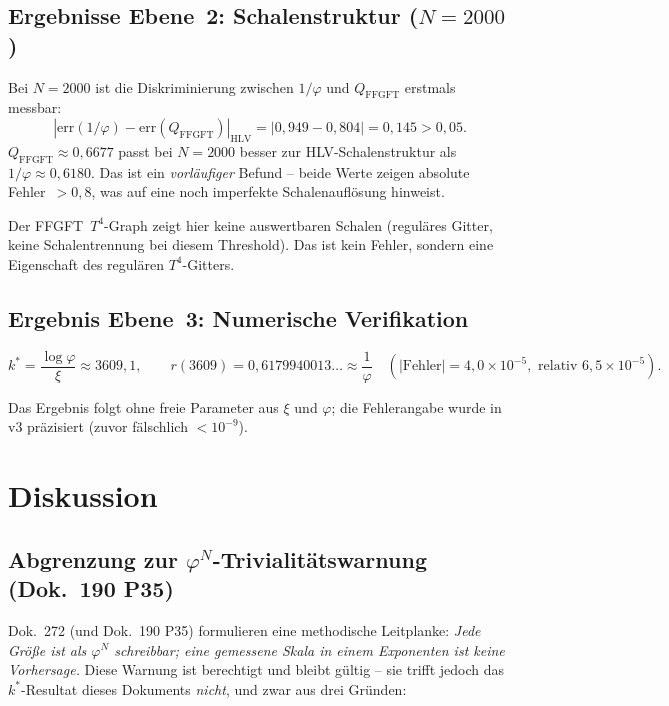 \subsection{Ergebnisse Ebene~2: Schalenstruktur ($N=2000$)}

Bei $N=2000$ ist die Diskriminierung zwischen $1/\varphi$ und
$Q_\mathrm{FFGFT}$ erstmals messbar:
\begin{equation}
  |{}\mathrm{err}(1/\varphi) - \mathrm{err}(Q_\mathrm{FFGFT}){}|_\mathrm{HLV}
  = |0{,}949 - 0{,}804| = 0{,}145 > 0{,}05.
\end{equation}
$Q_\mathrm{FFGFT} \approx 0{,}6677$ passt bei $N=2000$ besser zur
HLV-Schalenstruktur als $1/\varphi \approx 0{,}6180$. Das ist ein
\emph{vorläufiger} Befund -- beide Werte zeigen absolute Fehler~$> 0{,}8$,
was auf eine noch imperfekte Schalenauflösung hinweist.

Der FFGFT~$T^4$-Graph zeigt hier keine auswertbaren Schalen (reguläres
Gitter, keine Schalentrennung bei diesem Threshold). Das ist kein
Fehler, sondern eine Eigenschaft des regulären $T^4$-Gitters.

\subsection{Ergebnis Ebene~3: Numerische Verifikation}

\begin{equation}
  k^* = \frac{\log\varphi}{\xi} \approx 3609{,}1, \qquad
  r(3609) = 0{,}6179940013\ldots \approx \frac{1}{\varphi}
  \quad (|\text{Fehler}| = 4{,}0\times10^{-5},
  \text{ relativ } 6{,}5\times10^{-5}).
\end{equation}

Das Ergebnis folgt ohne freie Parameter aus $\xi$ und $\varphi$;
die Fehlerangabe wurde in v3 präzisiert (zuvor fälschlich $<10^{-9}$).

\section{Diskussion}

\subsection{Abgrenzung zur $\varphi^N$-Trivialitätswarnung (Dok.~190 P35)}

Dok.~272 (und Dok.~190 P35) formulieren eine methodische Leitplanke:
\emph{Jede Größe ist als $\varphi^N$ schreibbar; eine gemessene Skala in
einem Exponenten ist keine Vorhersage.} Diese Warnung ist berechtigt und
bleibt gültig -- sie trifft jedoch das $k^*$-Resultat dieses Dokuments
\emph{nicht}, und zwar aus drei Gründen:

